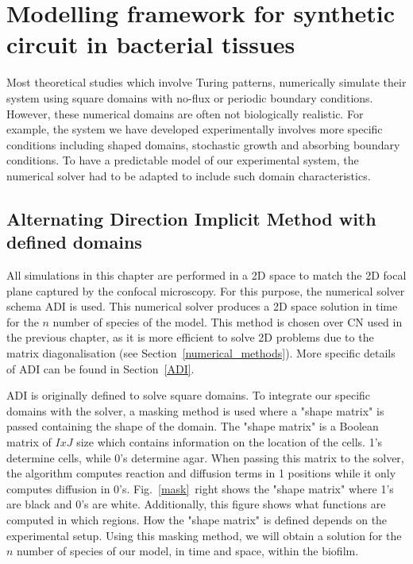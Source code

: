 \section{Modelling framework for synthetic circuit in bacterial tissues}
Most theoretical studies which involve Turing patterns, numerically simulate their system using square domains with no-flux or periodic boundary conditions.
However, these numerical domains are often not biologically realistic.
For example, the system we have developed experimentally involves more specific conditions including shaped domains, stochastic growth and absorbing boundary conditions.
To have a predictable model of our experimental system, the numerical solver had to be adapted to include such domain characteristics.

\subsection{Alternating Direction Implicit Method with defined domains}\label{Alternating Direction Implicit Method with defined domains}
All simulations in this chapter are performed in a \acrshort{2D} space to match the \acrshort{2D} focal plane captured by the confocal microscopy.
For this purpose, the numerical solver schema  \acrfull{ADI} is used.
This numerical solver produces a 2D space solution in time for the $n$ number of species of the model.
This method is chosen over \acrshort{CN} used in the previous chapter, as it is more efficient to solve 2D problems due to the matrix diagonalisation (see Section~\ref{numerical_methods}). More specific details of ADI can be found in Section~\ref{ADI}.



ADI is originally defined to solve square domains.
To integrate our specific domains with the solver, a masking method is used where a "shape matrix" is passed containing the shape of the domain.
The "shape matrix" is a Boolean matrix of $IxJ$ size which contains information on the location of the cells.
1's determine cells, while 0's determine agar.
When passing this matrix to the solver, the algorithm computes reaction and diffusion terms in 1 positions while it only computes diffusion in 0's.
Fig.~\ref{mask}~right shows the "shape matrix" where 1's are black and 0's are white.
Additionally, this figure shows what functions are computed in which regions.
How the "shape matrix" is defined depends on the experimental setup.
Using this masking method, we will obtain a solution for the $n$ number of species of our model, in time and space, within the biofilm.


